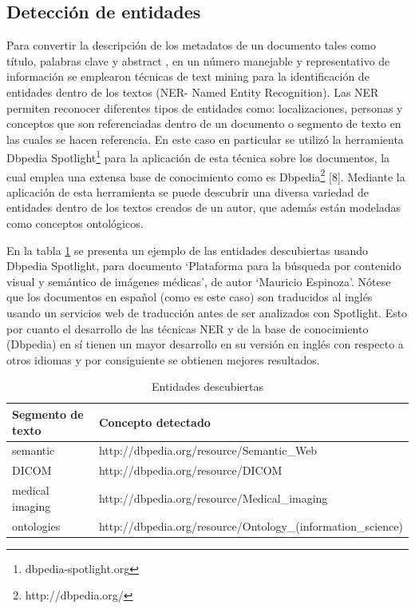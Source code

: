 \documentclass[conference]{IEEEtran}
\begin{document}
\subsection{Detección de entidades}
Para convertir la descripción de los metadatos de un documento tales como título, palabras clave y abstract , en un número manejable y representativo de información se emplearon técnicas de text mining para la identificación de entidades dentro de los textos (NER- Named Entity Recognition). Las NER  permiten reconocer diferentes tipos de entidades como: localizaciones, personas y conceptos que son referenciadas dentro de un documento o  segmento de texto en las cuales se hacen referencia.  En este caso en particular se utilizó la herramienta Dbpedia Spotlight\footnote{dbpedia-spotlight.org} para la aplicación de esta técnica sobre los documentos, la cual emplea una extensa base de conocimiento como es  Dbpedia\footnote{http://dbpedia.org/} [8]. Mediante la aplicación de esta herramienta se puede descubrir una diversa variedad de entidades dentro de los textos creados de un autor, que además están modeladas como conceptos ontológicos. 

En la tabla \ref{tb:entidades} se presenta un ejemplo de las entidades descubiertas usando Dbpedia Spotlight, para documento ‘Plataforma para la búsqueda por contenido visual y semántico de imágenes médicas’, de autor ‘Mauricio Espinoza’. Nótese que los documentos en español (como es este caso) son traducidos al inglés usando un servicios web de traducción antes de ser analizados con Spotlight. Esto por cuanto el desarrollo de las técnicas NER y de la base de conocimiento (Dbpedia) en sí tienen un mayor desarrollo en su versión en inglés con respecto a otros idiomas y por consiguiente se obtienen mejores resultados.

\begin{table}[]
\centering
\caption{Entidades descubiertas}
\label{tb:entidades}
\begin{tabular}{@{}ll@{}}
\toprule
Segmento de texto & Concepto detectado                                           \\ \midrule
semantic          & http://dbpedia.org/resource/Semantic\_Web                    \\
DICOM             & http://dbpedia.org/resource/DICOM                            \\
medical imaging   & http://dbpedia.org/resource/Medical\_imaging                 \\
ontologies        & http://dbpedia.org/resource/Ontology\_(information\_science) \\ \bottomrule
\end{tabular}
\end{table}
\end{document}
